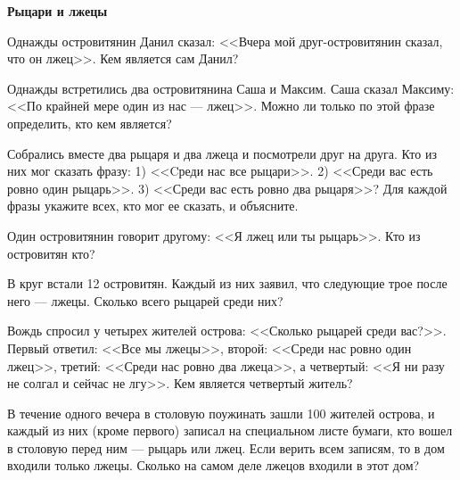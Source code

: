 \documentclass{article}
\begin{document}
    \large

    \begin{center}
        \textbf{Рыцари и лжецы}
    \end{center}
    \begin{enumerate_boxed}
        \item Однажды островитянин Данил сказал: <<Вчера мой друг-островитянин сказал, что он лжец>>.
        Кем является сам Данил?

        \item Однажды встретились два островитянина Саша и Максим.
        Саша сказал Максиму: <<По крайней мере один из нас — лжец>>.
        Можно ли только по этой фразе определить, кто кем является?

        \item Собрались вместе два рыцаря и два лжеца и посмотрели друг на друга.
        Кто из них мог сказать фразу: 1) <<Cреди нас все рыцари>>.
        2) <<Среди вас есть ровно один рыцарь>>.
        3) <<Среди вас есть ровно два рыцаря>>?
        Для каждой фразы укажите всех, кто мог ее сказать, и объясните.

        \item Один островитянин говорит другому: <<Я лжец или ты рыцарь>>.
        Кто из островитян кто?

        \item В круг встали 12 островитян.
        Каждый из них заявил, что следующие трое после него — лжецы.
        Сколько всего рыцарей среди них?

        \item Вождь спросил у четырех жителей острова: <<Сколько рыцарей среди вас?>>.
        Первый ответил: <<Все мы лжецы>>, второй: <<Среди нас ровно один лжец>>, третий: <<Среди нас ровно два лжеца>>, а четвертый: <<Я ни разу не солгал и сейчас не лгу>>.
        Кем является четвертый житель?

        \item  В течение одного вечера в столовую поужинать зашли 100 жителей острова, и каждый из них (кроме первого) записал на специальном листе бумаги, кто вошел в столовую перед ним — рыцарь или лжец.
        Если верить всем записям, то в дом входили только лжецы.
        Сколько на самом деле лжецов входили в этот дом?


\end{enumerate_boxed}
\end{document}
